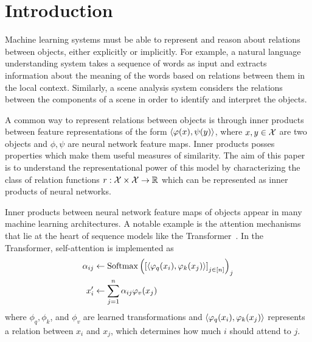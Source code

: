 \section{Introduction}\label{sec:intro}

Machine learning systems must be able to represent and reason about relations between objects, either explicitly or implicitly. For example, a natural language understanding system takes a sequence of words as input and extracts information about the meaning of the words based on relations between them in the local context. Similarly, a scene analysis system considers the relations between the components of a scene in order to identify and interpret the objects. 

A common way to represent relations between objects is through inner products between feature representations of the form $\left \langle \varphi(x), \psi(y) \right\rangle$, where $x, y \in {\mathcal{X}}$ are two objects and $\phi, \psi$ are neural network feature maps. Inner products posses properties which make them useful measures of similarity. The aim of this paper is to understand the representational power of this model by characterizing the class of relation functions $r: {\mathcal{X}} \times {\mathcal{X}} \to \mathbb{R}$ which can be represented as inner products of neural networks.

Inner products between neural network feature maps of objects appear in many machine learning architectures. A notable example is the attention mechanisms that lie at the heart of sequence models like the Transformer~\parencite{vaswani2017attention}. In the Transformer, self-attention is implemented as
\begin{equation*}
    \begin{split}
        \alpha_{ij} &\gets \mathrm{Softmax}\paren{\bra{{\iprod{\phi_q(x_i)}{\phi_k(x_j)}}}_{j \in [n]}}_j\\
        x_i' &\gets \sum_{j=1}^{n} \alpha_{ij} \phi_v(x_j)
    \end{split}
\end{equation*}
where $\phi_q, \phi_k$, and $\phi_v$ are learned transformations and $\left \langle \varphi_q(x_i), \varphi_k(x_j) \right\rangle$ represents a relation between $x_i$ and $x_j$, which determines how much $i$ should attend to $j$.

